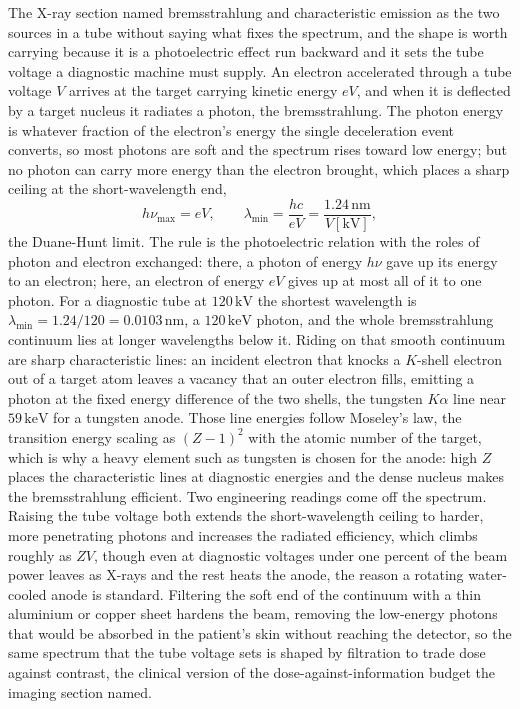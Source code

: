The X-ray section named bremsstrahlung and characteristic emission as the two
sources in a tube without saying what fixes the spectrum, and the shape is worth
carrying because it is a photoelectric effect run backward and it sets the tube
voltage a diagnostic machine must supply. An electron accelerated through a tube
voltage $V$ arrives at the target carrying kinetic energy $eV$, and when it is
deflected by a target nucleus it radiates a photon, the bremsstrahlung. The
photon energy is whatever fraction of the electron's energy the single
deceleration event converts, so most photons are soft and the spectrum rises
toward low energy; but no photon can carry more energy than the electron brought,
which places a sharp ceiling at the short-wavelength end,
\[
h\nu_{\max} = eV,
\qquad
\lambda_{\min} = \frac{hc}{eV}
              = \frac{1.24\,\si{\nano\meter}}{V[\si{\kilo\volt}]},
\]
the Duane-Hunt limit. The rule is the photoelectric relation with the roles of
photon and electron exchanged: there, a photon of energy $h\nu$ gave up its
energy to an electron; here, an electron of energy $eV$ gives up at most all of
it to one photon. For a diagnostic tube at $120\,\si{\kilo\volt}$ the shortest
wavelength is $\lambda_{\min} = 1.24/120 = 0.0103\,\si{\nano\meter}$, a
$120\,\si{\kilo\electronvolt}$ photon, and the whole bremsstrahlung continuum
lies at longer wavelengths below it. Riding on that smooth continuum are sharp
characteristic lines: an incident electron that knocks a $K$-shell electron out
of a target atom leaves a vacancy that an outer electron fills, emitting a photon
at the fixed energy difference of the two shells, the tungsten $K\alpha$ line
near $59\,\si{\kilo\electronvolt}$ for a tungsten anode. Those line energies
follow Moseley's law, the transition energy scaling as $(Z-1)^{2}$ with the
atomic number of the target, which is why a heavy element such as tungsten is
chosen for the anode: high $Z$ places the characteristic lines at diagnostic
energies and the dense nucleus makes the bremsstrahlung efficient. Two engineering
readings come off the spectrum. Raising the tube voltage both extends the
short-wavelength ceiling to harder, more penetrating photons and increases the
radiated efficiency, which climbs roughly as $ZV$, though even at diagnostic
voltages under one percent of the beam power leaves as X-rays and the rest heats
the anode, the reason a rotating water-cooled anode is standard. Filtering the
soft end of the continuum with a thin aluminium or copper sheet hardens the beam,
removing the low-energy photons that would be absorbed in the patient's skin
without reaching the detector, so the same spectrum that the tube voltage sets is
shaped by filtration to trade dose against contrast, the clinical version of the
dose-against-information budget the imaging section named.

